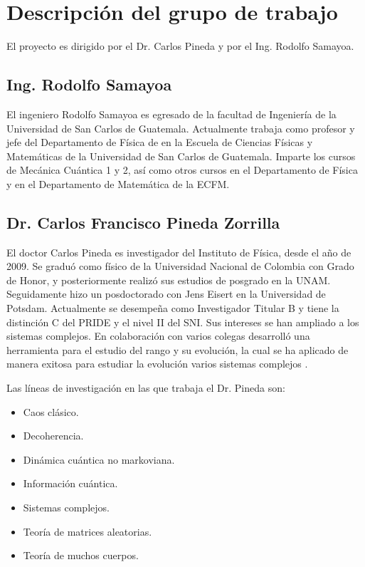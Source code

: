 \section{Descripción del grupo de trabajo}

El proyecto es dirigido por el Dr. Carlos Pineda y por el Ing. Rodolfo Samayoa.


\subsection{Ing. Rodolfo Samayoa}


El ingeniero Rodolfo Samayoa es egresado de la facultad de Ingeniería de la Universidad de San Carlos de Guatemala.
 Actualmente trabaja como profesor y jefe del Departamento de Física de en la Escuela de Ciencias Físicas y Matemáticas de la Universidad de San Carlos de Guatemala. Imparte los cursos de Mecánica Cuántica 1 y 2, así como otros cursos en el Departamento de Física y en el Departamento de Matemática de la ECFM.

\subsection{Dr. Carlos Francisco Pineda Zorrilla}
El doctor Carlos Pineda es investigador del Instituto de Física, desde el año de 2009. Se graduó como físico de la Universidad Nacional de Colombia con Grado de Honor, y posteriormente realizó sus estudios de posgrado en la UNAM. Seguidamente hizo un posdoctorado con Jens Eisert en la Universidad de Potsdam. Actualmente se desempeña como Investigador Titular B y tiene la distinción C del PRIDE y el nivel II del SNI. Sus intereses se han ampliado a los sistemas complejos. En colaboración con varios colegas desarrolló una herramienta para el estudio del rango y su evolución, la cual se ha aplicado de manera exitosa para estudiar la evolución varios sistemas complejos \cite{ifunam}.


Las líneas de investigación en las que trabaja el Dr. Pineda son:

\begin{itemize}
	\item Caos clásico.
	\item Decoherencia.
	\item Dinámica cuántica no markoviana.
	\item Información cuántica.
	\item Sistemas complejos.
	\item Teoría de matrices aleatorias.
	\item Teoría de muchos cuerpos.
\end{itemize}

